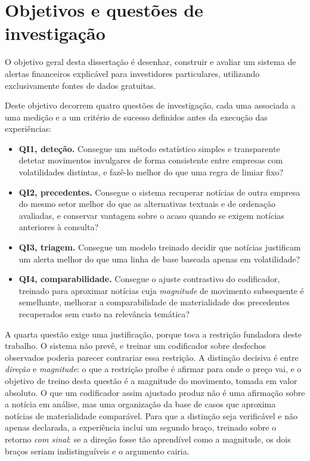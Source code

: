 \section{Objetivos e questões de investigação}
\label{sec:intro_objetivos}

O objetivo geral desta dissertação é desenhar, construir e avaliar um sistema de alertas
financeiros explicável para investidores particulares, utilizando exclusivamente fontes de dados
gratuitas.

Deste objetivo decorrem quatro questões de investigação, cada uma associada a uma medição e a um
critério de sucesso definidos antes da execução das experiências:
\begin{itemize}
  \item \textbf{\gls{QI}1, deteção.} Consegue um método estatístico simples e transparente detetar
        movimentos invulgares de forma consistente entre empresas com volatilidades distintas, e
        fazê-lo melhor do que uma regra de limiar fixo?
  \item \textbf{\gls{QI}2, precedentes.} Consegue o sistema recuperar notícias de outra
        empresa do mesmo setor melhor do que as alternativas textuais e de ordenação avaliadas,
        e conservar vantagem sobre o acaso quando se exigem notícias anteriores à consulta?
  \item \textbf{\gls{QI}3, triagem.} Consegue um modelo treinado decidir que notícias justificam um
        alerta melhor do que uma linha de base baseada apenas em volatilidade?
  \item \textbf{\gls{QI}4, comparabilidade.} Consegue o ajuste contrastivo do codificador,
        treinado para aproximar notícias cuja \emph{magnitude} de movimento subsequente é
        semelhante, melhorar a comparabilidade de materialidade dos precedentes recuperados sem
        custo na relevância temática?
\end{itemize}

A quarta questão exige uma justificação, porque toca a restrição fundadora deste trabalho. O
sistema não prevê, e treinar um codificador sobre desfechos observados poderia parecer contrariar
essa restrição. A distinção decisiva é entre \emph{direção} e \emph{magnitude}: o que a restrição
proíbe é afirmar para onde o preço vai, e o objetivo de treino desta questão é a magnitude do
movimento, tomada em valor absoluto. O que um codificador assim ajustado produz não é uma
afirmação sobre a notícia em análise, mas uma organização da base de casos que aproxima notícias
de materialidade comparável. Para que a distinção seja verificável e não apenas declarada, a
experiência inclui um segundo braço, treinado sobre o retorno \emph{com sinal}: se a direção fosse
tão aprendível como a magnitude, os dois braços seriam indistinguíveis e o argumento cairia.

